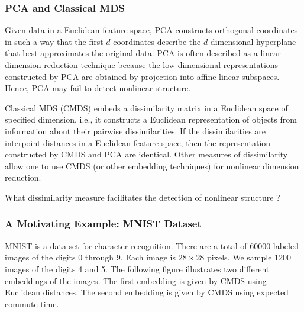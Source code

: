 \documentclass[professionalfonts, hyperref={pdfpagelabels=false,
  colorlinks=true, linkcolor=purple}]{beamer}
\begin{document}
\begin{frame}
  \frametitle{PCA and Classical MDS}
  Given data in a Euclidean feature space, PCA constructs orthogonal
  coordinates in such a way that the first $d$ coordinates describe
  the $d$-dimensional hyperplane that best approximates the original
  data. PCA is often described as a \alert{linear} dimension reduction
  technique because the low-dimensional representations constructed by
  PCA are obtained by projection into affine linear
  subspaces. Hence, PCA may fail to detect nonlinear structure.
  
\vskip10pt Classical MDS (CMDS) embeds a dissimilarity matrix in a
  Euclidean space of specified dimension, i.e., it constructs a
  Euclidean representation of objects from information about their
  pairwise dissimilarities. If the dissimilarities are interpoint
  distances in a Euclidean feature space, then the representation
  constructed by CMDS and PCA are identical. Other measures of dissimilarity
  allow one to use CMDS (or other embedding techniques) for
  \alert{nonlinear} dimension reduction. 
  
\vskip10pt What dissimilarity measure facilitates the detection of
nonlinear structure ?
\end{frame}
  
\begin{frame}
  \frametitle{A Motivating Example: MNIST Dataset}
  \label{motivating_example}
  MNIST \cite{lecun98:_gradien} is a data set for
  character recognition. There are a total of $60000$ labeled images
  of the digits $0$ through $9$. Each image is $28 \times 28$
  pixels. We sample 1200 images of the digits 4 and 5. The
  following figure illustrates two different embeddings of the
  images. The first embedding is given by CMDS using Euclidean
  distances. The second embedding is
  given by CMDS using expected commute time. 
  \begin{figure}
    \centering
  \end{figure}
\end{frame}
\end{document}
